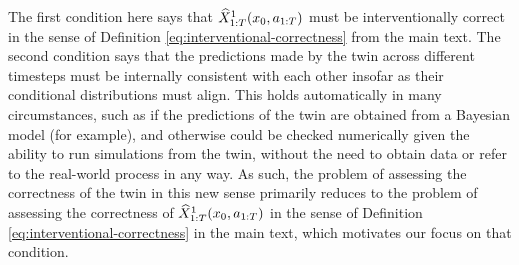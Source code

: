 The first condition here says that $\widehat{X}^1_{1:T}(x_0, a_{1:T})$ must be interventionally correct in the sense of Definition \ref{eq:interventional-correctness} from the main text.
The second condition says that the predictions made by the twin across different timesteps must be internally consistent with each other insofar as their conditional distributions must align.
This holds automatically in many circumstances, such as if the predictions of the twin are obtained from a Bayesian model (for example), and otherwise could be checked numerically given the ability to run simulations from the twin, without the need to obtain data or refer to the real-world process in any way.
As such, the problem of assessing the correctness of the twin in this new sense primarily reduces to the problem of assessing the correctness of $\widehat{X}^1_{1:T}(x_0, a_{1:T})$ in the sense of Definition \ref{eq:interventional-correctness} in the main text, which motivates our focus on that condition.


